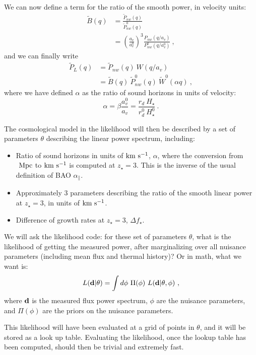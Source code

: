 We can now define a term for the ratio of the smooth power, in velocity
units:
\begin{align}
 \tilde B(q) & = \frac{\tilde P_{nw}(q)}{\tilde P^0_{nw}(q)}    \nonumber \\
  & = \left(\frac{a_v}{a_v^0}\right)^3 
      \frac{P_{nw}(q / a_v)}{P^0_{nw}(q / a_v^0)} ~,
\end{align}
and we can finally write 
\begin{align}
 \tilde P_L(q) & = \tilde P_{nw}(q) ~ W(q / a_v)                \nonumber \\
  & = \tilde B(q) ~ \tilde P^0_{nw}(q) ~ \tilde W^0(\alpha q) ~,
\end{align}
where we have defined $\alpha$ as the ratio of sound horizons in units of 
velocity: 
\begin{equation}
 \alpha = \beta \frac{a_v^0}{a_v} = \frac{r_d ~ H_\star}{r_d^0 ~ H^0_\star}~.
\end{equation}

The cosmological model in the likelihood will then be described by a 
set of parameters $\theta$ describing the linear power spectrum, including:
\begin{itemize}
 \item Ratio of sound horizons in units of ${\rm km~s^{-1}}$, $\alpha$, where the 
conversion from $\ \text{Mpc}$ to ${\rm km~s^{-1}}$ is computed at $z_\star=3$. 
This is the inverse of the usual definition of BAO $\alpha_\parallel$.
 \item Approximately 3 parameters describing the ratio of the smooth
  linear power at $z_\star=3$, in units of ${\rm km~s^{-1}}$.
 \item Difference of growth rates at $z_\star=3$, $\Delta f_\star$. 
\end{itemize}

We will ask the likelihood code: for these set of parameters $\theta$,
what is the likelihood of getting the measured power, after marginalizing
over all nuisance parameters (including mean flux and thermal history)?
Or in math, what we want is:
\begin{equation} \label{eq:marg}
 L(\mathbf{d} | \theta)
  = \int d\phi ~ \Pi(\phi) ~ L(\mathbf{d} | \theta, \phi) ~,
\end{equation}
where $\mathbf{d}$ is the measured flux power spectrum, $\phi$ are the nuisance
parameters, and $\Pi(\phi)$ are the priors on the nuisance parameters.

This likelihood will have been evaluated at a grid of points in $\theta$,
and it will be stored as a look up table.
Evaluating the likelihood, once the lookup table has been computed,
should then be trivial and extremely fast.

